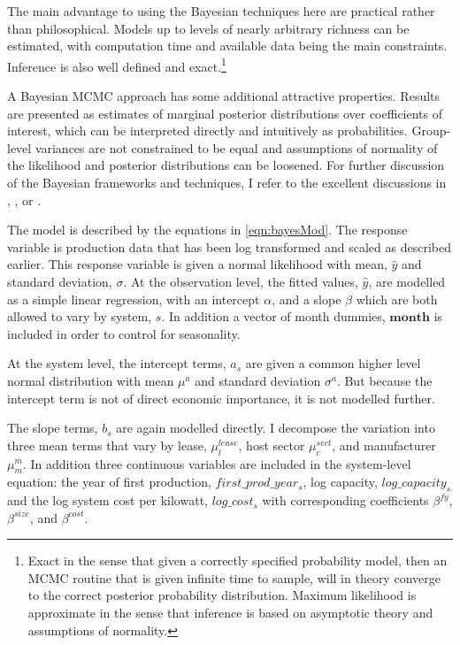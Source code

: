\documentclass[12pt]{article}
\begin{document}
The main advantage to using the Bayesian techniques here are practical rather than philosophical. Models up to levels of nearly arbitrary richness can be estimated, with computation time and available data being the main constraints. Inference is also well defined and exact.\footnote{Exact in the sense that given a correctly specified probability model, then an MCMC routine that is given infinite time to sample, will in theory converge to the correct posterior probability distribution. Maximum likelihood is approximate in the sense that inference is based on asymptotic theory and assumptions of normality.}

A Bayesian MCMC approach has some additional attractive properties. Results are presented as estimates of marginal posterior distributions over coefficients of interest, which can be interpreted directly and intuitively as probabilities. Group-level variances are not constrained to be equal and assumptions of normality of the likelihood and posterior distributions can be loosened. For further discussion of the Bayesian frameworks and techniques, I refer to the excellent discussions in \citet{gelman_bayesian_2013}, \citet{kruschke_doing_2014}, or \citet{mcelreath_statistical_2015}.

The model is described by the equations in \ref{eqn:bayesMod}. The response variable is production data that has been log transformed and scaled as described earlier. This response variable is given a normal likelihood with mean, $\hat{y}$ and standard deviation, $\sigma$. At the observation level, the fitted values, $\hat{y}$, are modelled as a simple linear regression, with an intercept $\alpha$, and a slope $\beta$ which are both allowed to vary by system, $s$. In addition a vector of month dummies, $\mathbf{month}$ is included in order to control for seasonality.

At the system level, the intercept terms, $a_s$ are given a common higher level normal distribution with mean $\mu^a$ and standard deviation $\sigma^a$. But because the intercept term is not of direct economic importance, it is not modelled further.

The slope terms, $b_s$ are again modelled directly. I decompose the variation into three mean terms that vary by lease, $\mu^{lease}_l$, host sector $\mu^{sect}_c$, and manufacturer $\mu^m_m$. In addition three continuous variables are included in the system-level equation: the year of first production, $first\_prod\_year_s$, log capacity, $log\_capacity_s$ and the log system cost per kilowatt, $log\_cost_s$ with corresponding coefficients $\beta^{fy}$, $\beta^{size}$, and $\beta^{cost}$.
\end{document}
